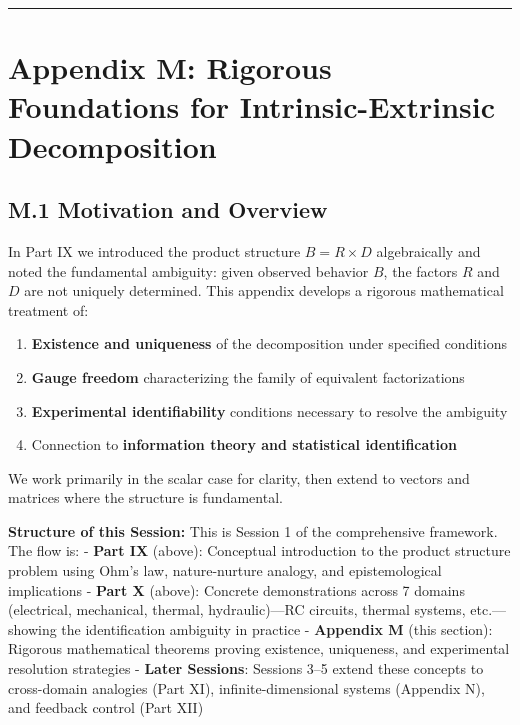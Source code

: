 \documentclass[
]{article}
\providecommand{\tightlist}{%
  \setlength{\itemsep}{0pt}\setlength{\parskip}{0pt}}
\begin{document}
\begin{center}\rule{0.5\linewidth}{0.5pt}\end{center}

\newpage

\section{Appendix M: Rigorous Foundations for Intrinsic-Extrinsic
Decomposition}\label{appendix-m-rigorous-foundations-for-intrinsic-extrinsic-decomposition}

\subsection{M.1 Motivation and
Overview}\label{m.1-motivation-and-overview}

In Part IX we introduced the product structure \(B = R \times D\)
algebraically and noted the fundamental ambiguity: given observed
behavior \(B\), the factors \(R\) and \(D\) are not uniquely determined.
This appendix develops a rigorous mathematical treatment of:

\begin{enumerate}
\def\labelenumi{\arabic{enumi}.}
\tightlist
\item
  \textbf{Existence and uniqueness} of the decomposition under specified
  conditions
\item
  \textbf{Gauge freedom} characterizing the family of equivalent
  factorizations
\item
  \textbf{Experimental identifiability} conditions necessary to resolve
  the ambiguity
\item
  Connection to \textbf{information theory and statistical
  identification}
\end{enumerate}

We work primarily in the scalar case for clarity, then extend to vectors
and matrices where the structure is fundamental.

\textbf{Structure of this Session:} This is Session 1 of the
comprehensive framework. The flow is: - \textbf{Part IX} (above):
Conceptual introduction to the product structure problem using Ohm's
law, nature-nurture analogy, and epistemological implications -
\textbf{Part X} (above): Concrete demonstrations across 7 domains
(electrical, mechanical, thermal, hydraulic)---RC circuits, thermal
systems, etc.---showing the identification ambiguity in practice -
\textbf{Appendix M} (this section): Rigorous mathematical theorems
proving existence, uniqueness, and experimental resolution strategies -
\textbf{Later Sessions}: Sessions 3--5 extend these concepts to
cross-domain analogies (Part XI), infinite-dimensional systems (Appendix
N), and feedback control (Part XII)
\end{document}
